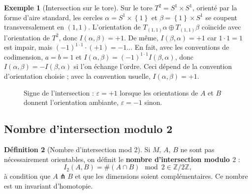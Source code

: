 \documentclass[12pt,a4paper,openany]{book}
\theoremstyle{definition}
\newtheorem{definition}{Définition}[chapter]
\newtheorem{exemple}[definition]{Exemple}
\theoremstyle{plain}
\theoremstyle{remark}
\newcommand{\Z}{\mathbb{Z}}
\newcommand{\set}[1]{\left\{#1\right\}}
\begin{document}
\begin{exemple}[Intersection sur le tore]\label{ex:intersection-tore-calcul}
Sur le tore $T^2 = S^1 \times S^1$, orienté par la forme d'aire standard,
les cercles $\alpha = S^1 \times \set{1}$ et $\beta = \set{1} \times S^1$
se coupent transversalement en $(1,1)$. L'orientation de
$T_{(1,1)}\alpha \oplus T_{(1,1)}\beta$ coïncide avec l'orientation de
$T^2$, donc $I(\alpha, \beta) = +1$. De même, $I(\beta, \alpha) = +1$
car $1 \cdot 1 = 1$ est impair, mais $(-1)^{1 \cdot 1} \cdot (+1) = -1$...
En fait, avec les conventions de codimension, $a = b = 1$ et
$I(\alpha, \beta) = (-1)^{1 \cdot 1} I(\beta, \alpha)$, donc
$I(\alpha, \beta) = -I(\beta, \alpha)$ si l'on échange l'ordre.
Ceci dépend de la convention d'orientation choisie ; avec la convention
usuelle, $I(\alpha, \beta) = +1$.
\end{exemple}

\begin{figure}[ht]
\centering
{}
\caption{Signe de l'intersection : $\varepsilon = +1$ lorsque les
  orientations de $A$ et $B$ donnent l'orientation ambiante,
  $\varepsilon = -1$ sinon.}
\label{fig:signe-intersection}
\end{figure}

\subsection{Nombre d'intersection modulo 2}\label{subsec:intersection-mod2}

\begin{definition}[Nombre d'intersection mod 2]%
\label{def:intersection-mod2}
Si $M$, $A$, $B$ ne sont pas nécessairement orientables, on définit le
\textbf{nombre d'intersection modulo $2$} :
\[
  I_2(A, B) = \# (A \cap B) \mod 2 \in \Z/2\Z,
\]
à condition que $A \pitchfork B$ et que les dimensions soient
complémentaires. Ce nombre est un invariant d'homotopie.
\end{definition}
\end{document}

